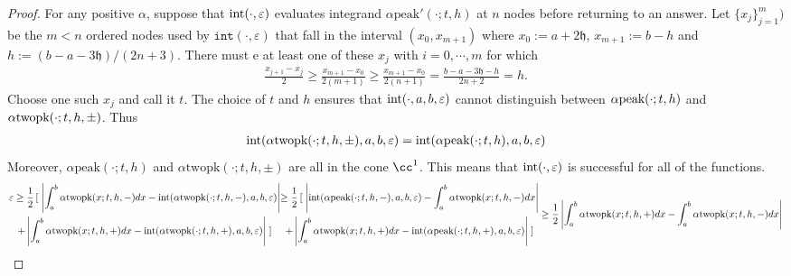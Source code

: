 \documentclass{iitthesis}
\theoremstyle{definition}
\theoremstyle{remark}
\begin{document}
\begin{proof}
  For any positive $\alpha$, suppose that $\textup{int}(\cdot,\varepsilon)$ evaluates integrand $\alpha\text{peak}'(\cdot;t,h)$ at $n$ nodes before returning to an answer. Let $\{x_j\}_{j=1}^{m})$ be the $m<n$ ordered nodes used by $\texttt{int}(\cdot,\varepsilon)$ that fall in the interval $(x_{0},x_{m+1})$ where $x_{0}:=a+2\mathfrak{h}$, $x_{m+1}:=b-h$ and $h:=(b-a-3\mathfrak{h})/(2n+3)$. There must e at least one of these $x_{j}$ with $i=0,\cdots,m$ for which
  \begin{align*}
    \frac{x_{j+1}-x_{j}}{2}\ge\frac{x_{m+1}-x_{0}}{2(m+1)}\ge\frac{x_{m+1}-x_{0}}{2(n+1)}=\frac{b-a-3\mathfrak{h}-h}{2n+2}=h.
  \end{align*}
  Choose one such $x_{j}$ and call it $t$. The choice of $t$ and $h$ ensures that $\textup{int}(\cdot,a,b,\varepsilon)$ cannot distinguish between $\alpha\textup{peak}(\cdot;t,h)$ and $\alpha\textup{twopk}(\cdot;t,h,\pm)$. Thus
  \begin{align*}
    \textup{int}(\alpha\text{twopk}(\cdot;t,h,\pm),a,b,\varepsilon)=\textup{int}(\alpha\text{peak}(\cdot;t,h),a,b,\varepsilon)
  \end{align*}
  Moreover, $\alpha\text{peak}(\cdot;t,h)$ and $\alpha\text{twopk}(\cdot;t,h,\pm)$ are all in the cone $\cc^1$. This means that $\textup{int}(\cdot,\varepsilon)$ is successful for all of the functions.
  \begin{subequations}
  \begin{multline*}
    \varepsilon\ge\frac{1}{2}\left[\right.\left|\int_{a}^{b}\alpha\textup{twopk}(x;t,h,-)dx-\textup{int}(\alpha\textup{twopk}(\cdot;t,h,-),a,b,\varepsilon)\right|\\
    +\left|\int_{a}^{b}\alpha\textup{twopk}(x;t,h,+)dx-\textup{int}(\alpha\textup{twopk}(\cdot;t,h,+),a,b,\varepsilon)\right|\left.\right]
  \end{multline*}
  \begin{multline*}
    \ge\frac{1}{2}\left[\right.\left|\textup{int}(\alpha\textup{peak}(\cdot;t,h,-),a,b,\varepsilon)-\int_{a}^{b}\alpha\textup{twopk}(x;t,h,-)dx\right|\\
    +\left|\int_{a}^{b}\alpha\textup{twopk}(x;t,h,+)dx-\textup{int}(\alpha\textup{peak}(\cdot;t,h,+),a,b,\varepsilon)\right|\left.\right]
  \end{multline*}
  \begin{align*}
     &\ge\frac{1}{2}\left|\int_{a}^{b}\alpha\textup{twopk}(x;t,h,+)dx-\int_{a}^{b}\alpha\textup{twopk}(x;t,h,-)dx\right|\\

\end{align*}
\end{subequations}
\end{proof}
\end{document}
